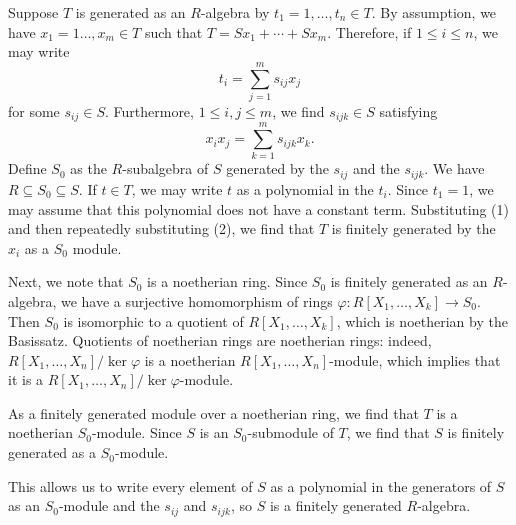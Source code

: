 Suppose $T$ is generated as an $R$-algebra by $t_1 = 1, \ldots, t_n \in T$.
By assumption, we have $x_1 = 1\ldots, x_m \in T$ such that $T = Sx_1 + \cdots + Sx_m$.
Therefore, if $1\leq i\leq n$, we may write
\begin{equation}\tag{1}
t_i = \sum_{j=1}^m s_{ij}x_j
\end{equation}
for some $s_{ij} \in S$. Furthermore,  $1\leq i, j\leq m$, we find $s_{ijk} \in S$
satisfying
\begin{equation}\tag{2}
x_ix_j = \sum_{k = 1}^m s_{ijk}x_k.
\end{equation}
Define $S_0$ as the $R$-subalgebra of $S$ generated by the $s_{ij}$ and the
$s_{ijk}$. We have $R \subseteq S_0 \subseteq S$. If $t \in T$, we may write
$t$ as a polynomial in the $t_i$. Since $t_1 = 1$, we may assume that this
polynomial does not have a constant term. Substituting (1) and then repeatedly
substituting (2), we find that $T$ is finitely generated by the $x_i$ as
a $S_0$ module.

Next, we note that $S_0$ is a noetherian ring. Since $S_0$ is finitely
generated as an $R$-algebra, we have a surjective homomorphism of rings
$\varphi\colon R[X_1, \ldots, X_k]\to S_0$. Then $S_0$ is isomorphic to a quotient
of $R[X_1, \ldots, X_k]$, which is noetherian by the Basissatz. Quotients
of noetherian rings are noetherian rings: indeed, $R[X_1, \ldots, X_n]/\ker\varphi$
is a noetherian $R[X_1, \ldots, X_n]$-module, which implies that it is a
$R[X_1, \ldots, X_n]/\ker\varphi$-module.

As a finitely generated module over a noetherian ring, we find that $T$ is
a noetherian $S_0$-module. Since $S$ is an $S_0$-submodule of $T$, we find that
$S$ is finitely generated as a $S_0$-module.

This allows us to write every element of $S$ as a polynomial in the generators
of $S$ as an $S_0$-module and the $s_{ij}$ and $s_{ijk}$, so $S$ is a finitely
generated $R$-algebra.
